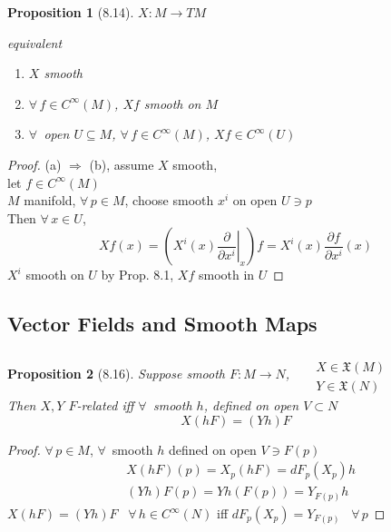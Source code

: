 \documentclass[11pt]{amsart}
\newtheorem{proposition}{Proposition}
\theoremstyle{definition}
\begin{document}
\begin{proposition}[8.14]
$X: M \to TM$

equivalent
\begin{enumerate}
\item[(a)] $X$ smooth
\item[(b)] $\forall \, f \in C^{\infty}(M)$, $Xf $ smooth on $M$
\item[(c)] $\forall \, $ open $U \subseteq M$, $\forall \, f \in C^{\infty}(M)$, $Xf \in C^{\infty}(U)$
\end{enumerate}
\end{proposition}

\begin{proof}
  (a) $\Longrightarrow $ (b), assume $X$ smooth, \\
let $f\in C^{\infty}(M)$ \\
$M$ manifold, $\forall \, p \in M$, choose smooth $x^i$ on open $U\ni p$ \\
Then $\forall \, x \in U$,
\[
Xf(x) = \left( \left. X^i(x) \frac{ \partial }{ \partial x^i} \right|_x \right) f = X^i(x) \frac{ \partial f}{ \partial x^i}(x)
\]
$X^i$ smooth on $U$ by Prop. 8.1, $Xf$ smooth in $U$
\end{proof}

\subsection*{Vector Fields and Smooth Maps}

\begin{proposition}[8.16]
  Suppose smooth $F:M\to N$, \quad \, $\begin{aligned} & \quad \\
    & X \in \mathfrak{X}(M) \\
    & Y \in \mathfrak{X}(N) \end{aligned}$ \\

Then $X,Y$ $F$-related iff $\forall \, $ smooth $h$, defined on open $V \subset N$
\[
X(hF) = (Yh)F
\]



\end{proposition}

\begin{proof}
$\forall \, p \in M$, $\forall \, $ smooth $h$ defined on open $V \ni F(p)$
\[
\begin{aligned}
  & X(hF)(p) = X_p(hF) = dF_p(X_p)h \\
  & (Yh)F(p) = Yh(F(p)) = Y_{F(p)}h
\end{aligned}
\]
$X(hF) = (Yh)F$ \quad \, $\forall \, h \in C^{\infty}(N)$ iff $dF_p(X_p) = Y_{F(p)}$ \, $\forall \, p$




\end{proof}
\end{document}
